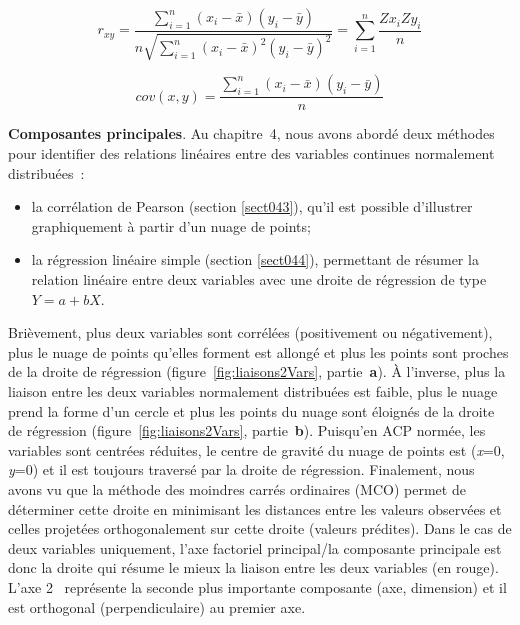 \documentclass[
  11pt,
  french,
]{book}
\providecommand{\tightlist}{%
  \setlength{\itemsep}{0pt}\setlength{\parskip}{0pt}}
\begin{document}
\footnotesize

\begin{equation}
r_{xy} = \frac{\sum_{i=1}^n (x_{i}-\bar{x})(y_{i}-\bar{y})}{n\sqrt{\sum_{i=1}^n(x_i - \bar{x})^2(y_i - \bar{y})^2}}=\sum_{i=1}^n\frac{Zx_iZy_i}{n}
\label{eq:ACPcor}
\end{equation}
\normalsize

\footnotesize

\begin{equation}
cov(x,y) = \frac{\sum_{i=1}^n (x_{i}-\bar{x})(y_{i}-\bar{y})}{n}
\label{eq:ACPcov}
\end{equation}
\normalsize

\textbf{Composantes principales}. Au chapitre~4, nous avons abordé deux méthodes pour identifier des relations linéaires entre des variables continues normalement distribuées~:

\begin{itemize}
\tightlist
\item
  la corrélation de Pearson (section \ref{sect043}), qu'il est possible d'illustrer graphiquement à partir d'un nuage de points;
\item
  la régression linéaire simple (section \ref{sect044}), permettant de résumer la relation linéaire entre deux variables avec une droite de régression de type \(Y=a+bX\).
\end{itemize}

Brièvement, plus deux variables sont corrélées (positivement ou négativement), plus le nuage de points qu'elles forment est allongé et plus les points sont proches de la droite de régression (figure~\ref{fig:liaisons2Vars}, partie~\textbf{a}). À l'inverse, plus la liaison entre les deux variables normalement distribuées est faible, plus le nuage prend la forme d'un cercle et plus les points du nuage sont éloignés de la droite de régression (figure~\ref{fig:liaisons2Vars}, partie~\textbf{b}). Puisqu'en ACP normée, les variables sont centrées réduites, le centre de gravité du nuage de points est (\emph{x}=0, \emph{y}=0) et il est toujours traversé par la droite de régression. Finalement, nous avons vu que la méthode des moindres carrés ordinaires (MCO) permet de déterminer cette droite en minimisant les distances entre les valeurs observées et celles projetées orthogonalement sur cette droite (valeurs prédites). Dans le cas de deux variables uniquement, l'axe factoriel principal/la composante principale est donc la droite qui résume le mieux la liaison entre les deux variables (en rouge). L'axe 2~ représente la seconde plus importante composante (axe, dimension) et il est orthogonal (perpendiculaire) au premier axe.
\end{document}
